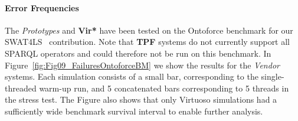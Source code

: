 %




%



\paragraph{Error Frequencies}

The \emph{Prototypes} and \textbf{Vir*} have been tested on the Ontoforce benchmark for our SWAT4LS~\cite{dewitte_swat4ls_2016} contribution. Note that \textbf{TPF} systems do not currently support all SPARQL operators and could therefore not be run on this benchmark.  In Figure~\ref{fig:Fig09_FailuresOntoforceBM} we show the results for the \emph{Vendor} systems. Each simulation consists of a small bar, corresponding to the single-threaded warm-up run, and 5 concatenated bars corresponding to 5 threads in the stress test.
The Figure also shows that only Virtuoso simulations had a sufficiently wide benchmark survival interval to enable further analysis.

